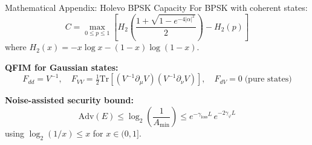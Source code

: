 \documentclass[aspectratio=169,10pt]{beamer}
\newcommand{\Tr}{\mathrm{Tr}}
\begin{document}
\begin{frame}{Mathematical Appendix: Holevo BPSK Capacity}
  For BPSK with coherent states:
  \[
    C=\max_{0\le p\le1}\!\left[
      H_2\!\left(\frac{1+\sqrt{1-e^{-4|\alpha|^2}}}{2}\right)
      -H_2(p)\right]
  \]
  where $H_2(x)=-x\log x-(1-x)\log(1-x)$.

  \bigskip
  \textbf{QFIM for Gaussian states:}
  \[
    F_{dd}=V^{-1},\quad
    F_{VV}=\tfrac{1}{2}\Tr[(V^{-1}\partial_\mu V)(V^{-1}\partial_\nu V)],\quad
    F_{dV}=0\;\text{(pure states)}
  \]

  \bigskip
  \textbf{Noise-assisted security bound:}
  \[
    \mathrm{Adv}(E)\le\log_2\!\left(\frac{1}{A_{\min}}\right)
    \le e^{-\gamma_{\text{loss}}L}\,e^{-2\gamma_\varphi L}
  \]
  using $\log_2(1/x)\le x$ for $x\in(0,1]$.
\end{frame}
\end{document}
